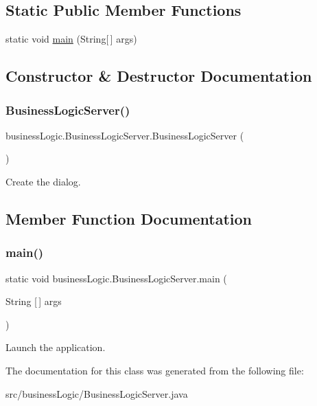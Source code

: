 \subsection*{Static Public Member Functions}
\begin{DoxyCompactItemize}
\item 
static void \mbox{\hyperlink{classbusiness_logic_1_1_business_logic_server_a978c1596ce77baed488f137fc96a4fe8}{main}} (String\mbox{[}$\,$\mbox{]} args)
\end{DoxyCompactItemize}


\subsection{Constructor \& Destructor Documentation}
\mbox{\label{classbusiness_logic_1_1_business_logic_server_a45e022d6b8b68567423caab4157e2784}} 
\subsubsection{\texorpdfstring{BusinessLogicServer()}{BusinessLogicServer()}}
{\footnotesize\ttfamily business\+Logic.\+Business\+Logic\+Server.\+Business\+Logic\+Server (\begin{DoxyParamCaption}{ }\end{DoxyParamCaption})}

Create the dialog. 

\subsection{Member Function Documentation}
\mbox{\label{classbusiness_logic_1_1_business_logic_server_a978c1596ce77baed488f137fc96a4fe8}} 
\subsubsection{\texorpdfstring{main()}{main()}}
{\footnotesize\ttfamily static void business\+Logic.\+Business\+Logic\+Server.\+main (\begin{DoxyParamCaption}\item[{String \mbox{[}$\,$\mbox{]}}]{args }\end{DoxyParamCaption})\hspace{0.3cm}{\ttfamily [static]}}

Launch the application. 

The documentation for this class was generated from the following file\+:\begin{DoxyCompactItemize}
\item 
src/business\+Logic/Business\+Logic\+Server.\+java\end{DoxyCompactItemize}
